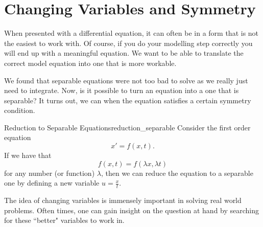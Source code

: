         \section{Changing Variables and Symmetry}

        When presented with a differential equation, it can often be in a form that is not the easiest to work with.  Of course, if you do your modelling step correctly you will end up with a meaningful equation.  We want to be able to translate the correct model equation into one that is more workable.

        We found that separable equations were not too bad to solve as we really just need to integrate.  Now, is it possible to turn an equation into a one that is separable? It turns out, we can when the equation satisfies a certain symmetry condition.

        \begin{prop}{Reduction to Separable Equations}{reduction_separable}
            Consider the first order equation
            \[
            x'=f(x,t).
            \]
            If we have that
            \[
            f(x,t)=f(\lambda x, \lambda t)
            \]
            for any number (or function) $\lambda$, then we can reduce the equation to a separable one by defining a new variable $u=\frac{x}{t}$.
        \end{prop}

        The idea of changing variables is immensely important in solving real world problems.  Often times, one can gain insight on the question at hand by searching for these ``better" variables to work in.

